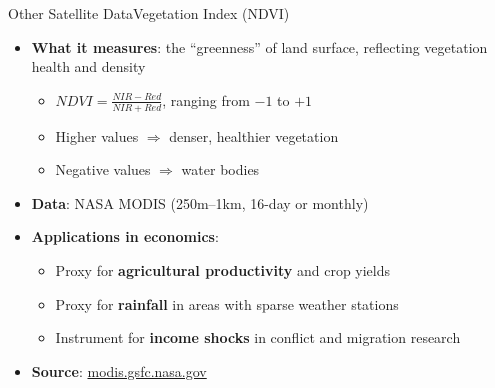 \documentclass[dvipsnames,hyperref={pdfpagelabels=false}]{beamer}
\begin{document}
\begin{frame}{Other Satellite Data}{Vegetation Index (NDVI)}
\begin{itemize}
    \item \textbf{What it measures}: the ``greenness'' of land surface,
    reflecting vegetation health and density
    \vspace{0.2cm}
    \begin{itemize}
        \item $NDVI = \frac{NIR - Red}{NIR + Red}$, ranging from $-1$ to $+1$
        \vspace{0.1cm}
        \item Higher values $\Rightarrow$ denser, healthier vegetation
        \vspace{0.1cm}
        \item Negative values $\Rightarrow$ water bodies
    \end{itemize}
    \vspace{0.2cm}
    \item \textbf{Data}: NASA MODIS (250m--1km, 16-day or monthly)
    \vspace{0.2cm}
    \item \textbf{Applications in economics}:
    \vspace{0.1cm}
    \begin{itemize}
        \item Proxy for \textbf{agricultural productivity} and crop yields
        \vspace{0.1cm}
        \item Proxy for \textbf{rainfall} in areas with sparse weather stations
        \vspace{0.1cm}
        \item Instrument for \textbf{income shocks} in conflict and migration research
    \end{itemize}
    \vspace{0.2cm}
    \item \textbf{Source}: 
    \href{https://modis.gsfc.nasa.gov/data/dataprod/mod13.php}{modis.gsfc.nasa.gov}
\end{itemize}
\end{frame}
\end{document}
